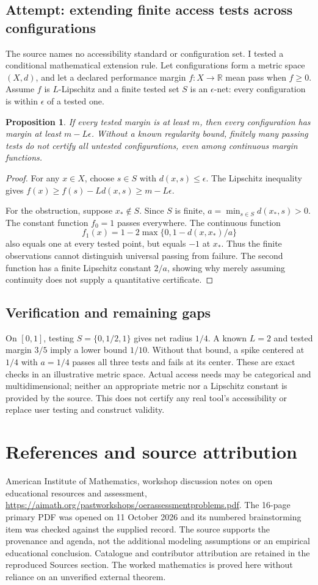 \documentclass[11pt]{article}
\newtheorem{proposition}{Proposition}
\begin{document}
\subsection{Attempt: extending finite access tests across configurations}
The source names no accessibility standard or configuration set. I tested a conditional mathematical extension rule. Let configurations form a metric space $(X,d)$, and let a declared performance margin $f:X\to\mathbb R$ mean pass when $f\ge0$. Assume $f$ is $L$-Lipschitz and a finite tested set $S$ is an $\epsilon$-net: every configuration is within $\epsilon$ of a tested one.
\begin{proposition}
If every tested margin is at least $m$, then every configuration has margin at least $m-L\epsilon$. Without a known regularity bound, finitely many passing tests do not certify all untested configurations, even among continuous margin functions.
\end{proposition}
\begin{proof}
For any $x\in X$, choose $s\in S$ with $d(x,s)\le\epsilon$. The Lipschitz inequality gives $f(x)\ge f(s)-Ld(x,s)\ge m-L\epsilon$.

For the obstruction, suppose $x_*\notin S$. Since $S$ is finite, $a=\min_{s\in S}d(x_*,s)>0$. The constant function $f_0=1$ passes everywhere. The continuous function
\[
f_1(x)=1-2\max\{0,1-d(x,x_*)/a\}
\]
also equals one at every tested point, but equals $-1$ at $x_*$. Thus the finite observations cannot distinguish universal passing from failure. The second function has a finite Lipschitz constant $2/a$, showing why merely assuming continuity does not supply a quantitative certificate.
\end{proof}
\subsection{Verification and remaining gaps}
On $[0,1]$, testing $S=\{0,1/2,1\}$ gives net radius $1/4$. A known $L=2$ and tested margin $3/5$ imply a lower bound $1/10$. Without that bound, a spike centered at $1/4$ with $a=1/4$ passes all three tests and fails at its center. These are exact checks in an illustrative metric space. Actual access needs may be categorical and multidimensional; neither an appropriate metric nor a Lipschitz constant is provided by the source. This does not certify any real tool's accessibility or replace user testing and construct validity.

\section{References and source attribution}
American Institute of Mathematics, workshop discussion notes on open educational resources and assessment, \url{https://aimath.org/pastworkshops/oerassessmentproblems.pdf}. The 16-page primary PDF was opened on 11 October 2026 and its numbered brainstorming item was checked against the supplied record. The source supports the provenance and agenda, not the additional modeling assumptions or an empirical educational conclusion. Catalogue and contributor attribution are retained in the reproduced Sources section. The worked mathematics is proved here without reliance on an unverified external theorem.
\end{document}

